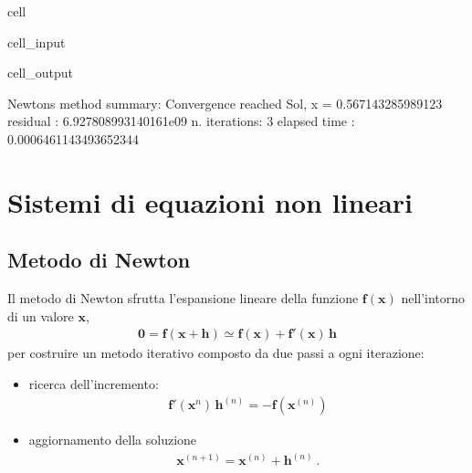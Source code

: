 \documentclass[letterpaper,10pt,italian]{jupyterBook}
\begin{document}
\begin{sphinxuseclass}{cell}
\begin{sphinxVerbatimInput}
\begin{sphinxuseclass}{cell_input}
\end{sphinxuseclass}\end{sphinxVerbatimInput}
\begin{sphinxVerbatimOutput}

\begin{sphinxuseclass}{cell_output}
\begin{sphinxVerbatim}[commandchars=\\\{\}]
Newton\PYGZsq{}s method summary: 
Convergence reached
Sol, x = \PYGZhy{}0.567143285989123
residual     : 6.927808993140161e\PYGZhy{}09
n. iterations: 3
elapsed time : 0.0006461143493652344
\end{sphinxVerbatim}

\end{sphinxuseclass}\end{sphinxVerbatimOutput}

\end{sphinxuseclass}

\section{Sistemi di equazioni non lineari}
\label{\detokenize{ch/numerics/nonlinear:sistemi-di-equazioni-non-lineari}}

\subsection{Metodo di Newton}
\label{\detokenize{ch/numerics/nonlinear:id1}}
\sphinxAtStartPar
Il metodo di Newton sfrutta l’espansione lineare della funzione \(\mathbf{f}(\mathbf{x})\) nell’intorno di un valore \(\mathbf{x}\),
\begin{equation*}
\begin{split}\mathbf{0} = \mathbf{f}(\mathbf{x} + \mathbf{h}) \simeq \mathbf{f}(\mathbf{x}) + \mathbf{f}'(\mathbf{x}) \, \mathbf{h}\end{split}
\end{equation*}
\sphinxAtStartPar
per costruire un metodo iterativo composto da due passi a ogni iterazione:
\begin{itemize}
\item {} 
\sphinxAtStartPar
ricerca dell’incremento:
\begin{equation*}
\begin{split}\mathbf{f}'(\mathbf{x}^{n}) \, \mathbf{h}^{(n)} = - \mathbf{f}(\mathbf{x}^{(n)})\end{split}
\end{equation*}
\item {} 
\sphinxAtStartPar
aggiornamento della soluzione
\begin{equation*}
\begin{split}\mathbf{x}^{(n+1)} = \mathbf{x}^{(n)} + \mathbf{h}^{(n)} \ .\end{split}
\end{equation*}
\end{itemize}
\end{document}

